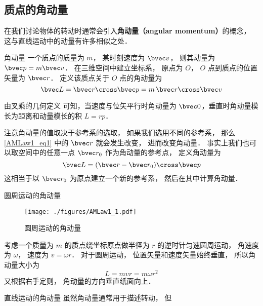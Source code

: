 

\subsection{质点的角动量}
在我们讨论物体的转动时通常会引入\textbf{角动量（angular momentum）}的概念， 这与直线运动中的动量有许多相似之处．

\begin{definition}{角动量}
一个质点的质量为 $m$， 某时刻速度为 $\bvec v$， 则其动量为 $\bvec p = m\bvec v$． 在三维空间中建立坐标系， 原点为 $O$， $O$ 点到质点的位置矢量为 $\bvec r$． 定义该质点关于 $O$ 点的角动量为
\begin{equation}\label{AMLaw1_eq1}
\bvec L = \bvec r \cross \bvec p = m \,\bvec r\cross \bvec v
\end{equation}
\end{definition}

由叉乘的几何定义 可知，当速度与位矢平行时角动量为 $\bvec 0$，垂直时角动量模长为距离和动量模长的积 $L = rp$．

注意角动量的值取决于参考系的选取， 如果我们选用不同的参考系， 那么\autoref{AMLaw1_eq1} 中的 $\bvec r$ 就会发生改变， 进而改变角动量． 事实上我们也可以取空间中的任意一点 $\bvec r_0$ 作为角动量的参考点， 定义角动量为
\begin{equation}
\bvec L = (\bvec r - \bvec r_0) \cross \bvec p
\end{equation}
这相当于以 $\bvec r_0$ 为原点建立一个新的参考系， 然后在其中计算角动量．

\begin{example}{圆周运动的角动量}
\begin{figure}[ht]
\centering
\texttt{[image: ./figures/AMLaw1\_1.pdf]}
\caption{圆周运动的角动量} \label{AMLaw1_fig1}
\end{figure}
考虑一个质量为 $m$ 的质点绕坐标原点做半径为 $r$ 的逆时针匀速圆周运动， 角速度为 $\omega$， 速度为 $v = \omega r$． 对于圆周运动， 位置矢量和速度矢量始终垂直， 所以角动量大小为
\begin{equation}
L = mvr = m\omega r^2
\end{equation}
又根据右手定则， 角动量的方向垂直纸面向上．
\end{example}

\begin{example}{直线运动的角动量}
虽然角动量通常用于描述转动， 但
\end{example}

